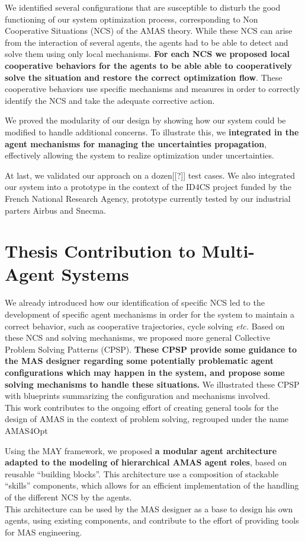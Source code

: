 We identified several configurations that are susceptible to disturb the good functioning of our system optimization process, corresponding to Non Cooperative Situations (NCS) of the AMAS theory. While these NCS can arise from the interaction of several agents, the agents had to be able to detect and solve them using only local mechanisms. \textbf{For each NCS we proposed local cooperative behaviors for the agents to be able able to cooperatively solve the situation and restore the correct optimization flow}. These cooperative behaviors use specific mechanisms and measures in order to correctly identify the NCS and take the adequate corrective action.

We proved the modularity of our design by showing how our system could be modified to handle additional concerns. To illustrate this, we \textbf{integrated in the agent mechanisms for managing the uncertainties propagation}, effectively allowing the system to realize optimization under uncertainties.

At last, we validated our approach on a dozen[[?]] test cases. We also integrated our system into a prototype in the context of the ID4CS project funded by the French National Research Agency, prototype currently tested by our industrial parters Airbus and Snecma.

\section*{Thesis Contribution to Multi-Agent Systems}

We already introduced how our identification of specific NCS led to the development of specific agent mechanisms in order for the system to maintain a correct behavior, such as cooperative trajectories, cycle solving \emph{etc.} Based on these NCS and solving mechanisms, we proposed more general Collective Problem Solving Patterns (CPSP). \textbf{These CPSP provide some guidance to the MAS designer regarding some potentially problematic agent configurations which may happen in the system, and propose some solving mechanisms to handle these situations.} We illustrated these CPSP with blueprints summarizing the configuration and mechanisms involved.\\
This work contributes to the ongoing effort of creating general tools for the design of AMAS in the context of problem solving, regrouped under the name AMAS4Opt

Using the MAY framework, we proposed \textbf{a modular agent architecture adapted to the modeling of hierarchical AMAS agent roles}, based on reusable \enquote{building blocks}. This architecture use a composition of stackable \enquote{skills} components, which allows for an efficient implementation of the handling of the different NCS by the agents.\\
This architecture can be used by the MAS designer as a base to design his own agents, using existing components, and contribute to the effort of providing tools for MAS engineering.

